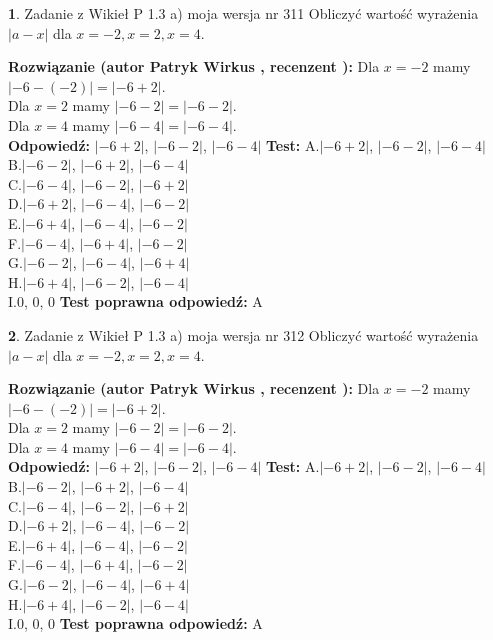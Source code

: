 \documentclass[12pt, a4paper]{article}
\theoremstyle{definition} %
\newtheorem{zad}{}
\newcommand{\zadStart}[1]{\begin{zad}#1\newline}
\newcommand{\zadStop}{\end{zad}}
\newcommand{\rozwStart}[2]{\noindent \textbf{Rozwiązanie (autor #1 , recenzent #2): }\newline}
\newcommand{\rozwStop}{\newline}
\newcommand{\odpStart}{\noindent \textbf{Odpowiedź:}\newline}
\newcommand{\odpStop}{\newline}
\newcommand{\testStart}{\noindent \textbf{Test:}\newline}
\newcommand{\testStop}{\newline}
\newcommand{\kluczStart}{\noindent \textbf{Test poprawna odpowiedź:}\newline}
\newcommand{\kluczStop}{\newline}
\begin{document}
\zadStart{Zadanie z Wikieł P 1.3 a) moja wersja nr 311}
Obliczyć wartość wyrażenia $|a - x|$ dla $x=-2,x=2,x=4$.
\zadStop
\rozwStart{Patryk Wirkus}{}
Dla $x = -2$ mamy $|-6 - (-2)| = |-6 + 2|$.\\
Dla $x = 2$ mamy $|-6 - 2| = |-6 - 2|$.\\
Dla $x = 4$ mamy $|-6 - 4| = |-6 - 4|$.\\
\rozwStop
\odpStart
$|-6 + 2|$, $|-6 - 2|$, $|-6 - 4|$
\odpStop
\testStart
A.$|-6 + 2|$, $|-6 - 2|$, $|-6 - 4|$\\
B.$|-6 - 2|$, $|-6 + 2|$, $|-6 - 4|$\\
C.$|-6 - 4|$, $|-6 - 2|$, $|-6 + 2|$\\
D.$|-6 + 2|$, $|-6 - 4|$, $|-6 - 2|$\\
E.$|-6 + 4|$, $|-6 - 4|$, $|-6 - 2|$\\
F.$|-6 - 4|$, $|-6 + 4|$, $|-6 - 2|$\\
G.$|-6 - 2|$, $|-6 - 4|$, $|-6 + 4|$\\
H.$|-6 + 4|$, $|-6 - 2|$, $|-6 - 4|$\\
I.$0$, $0$, $0$
\testStop
\kluczStart
A
\kluczStop



\zadStart{Zadanie z Wikieł P 1.3 a) moja wersja nr 312}
Obliczyć wartość wyrażenia $|a - x|$ dla $x=-2,x=2,x=4$.
\zadStop
\rozwStart{Patryk Wirkus}{}
Dla $x = -2$ mamy $|-6 - (-2)| = |-6 + 2|$.\\
Dla $x = 2$ mamy $|-6 - 2| = |-6 - 2|$.\\
Dla $x = 4$ mamy $|-6 - 4| = |-6 - 4|$.\\
\rozwStop
\odpStart
$|-6 + 2|$, $|-6 - 2|$, $|-6 - 4|$
\odpStop
\testStart
A.$|-6 + 2|$, $|-6 - 2|$, $|-6 - 4|$\\
B.$|-6 - 2|$, $|-6 + 2|$, $|-6 - 4|$\\
C.$|-6 - 4|$, $|-6 - 2|$, $|-6 + 2|$\\
D.$|-6 + 2|$, $|-6 - 4|$, $|-6 - 2|$\\
E.$|-6 + 4|$, $|-6 - 4|$, $|-6 - 2|$\\
F.$|-6 - 4|$, $|-6 + 4|$, $|-6 - 2|$\\
G.$|-6 - 2|$, $|-6 - 4|$, $|-6 + 4|$\\
H.$|-6 + 4|$, $|-6 - 2|$, $|-6 - 4|$\\
I.$0$, $0$, $0$
\testStop
\kluczStart
A
\kluczStop
\end{document}
